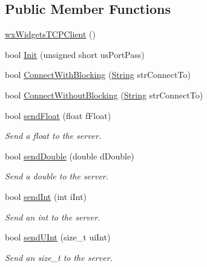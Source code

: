\subsection*{Public Member Functions}
\begin{DoxyCompactItemize}
\item 
\mbox{\hyperlink{class_rad_j_a_v_1_1_networking_1_1wx_widgets_t_c_p_client_af80442d38749a9cd12a45ef7d8f7928c}{wx\+Widgets\+T\+C\+P\+Client}} ()
\item 
bool \mbox{\hyperlink{class_rad_j_a_v_1_1_networking_1_1wx_widgets_t_c_p_client_aee6ffb935babab8f984e3edd6ab100cd}{Init}} (unsigned short us\+Port\+Pass)
\item 
bool \mbox{\hyperlink{class_rad_j_a_v_1_1_networking_1_1wx_widgets_t_c_p_client_a92d5158fc70110d7c152d32382418640}{Connect\+With\+Blocking}} (\mbox{\hyperlink{class_rad_j_a_v_1_1_string}{String}} str\+Connect\+To)
\item 
bool \mbox{\hyperlink{class_rad_j_a_v_1_1_networking_1_1wx_widgets_t_c_p_client_a2aebbf48ef53705babf0f4914cc8e23e}{Connect\+Without\+Blocking}} (\mbox{\hyperlink{class_rad_j_a_v_1_1_string}{String}} str\+Connect\+To)
\item 
bool \mbox{\hyperlink{class_rad_j_a_v_1_1_networking_1_1wx_widgets_t_c_p_client_ad683dafeb275ab9b1dd60bcd1f177107}{send\+Float}} (float f\+Float)
\begin{DoxyCompactList}\small\item\em Send a float to the server. \end{DoxyCompactList}\item 
bool \mbox{\hyperlink{class_rad_j_a_v_1_1_networking_1_1wx_widgets_t_c_p_client_afb57ef92f150833532015d14475a5ae1}{send\+Double}} (double d\+Double)
\begin{DoxyCompactList}\small\item\em Send a double to the server. \end{DoxyCompactList}\item 
bool \mbox{\hyperlink{class_rad_j_a_v_1_1_networking_1_1wx_widgets_t_c_p_client_a8463c6778160ef13bfd87dac47676614}{send\+Int}} (int i\+Int)
\begin{DoxyCompactList}\small\item\em Send an int to the server. \end{DoxyCompactList}\item 
bool \mbox{\hyperlink{class_rad_j_a_v_1_1_networking_1_1wx_widgets_t_c_p_client_a548db141df3e65127f8a96dbfe63cea1}{send\+U\+Int}} (size\+\_\+t ui\+Int)
\begin{DoxyCompactList}\small\item\em Send an size\+\_\+t to the server. \end{DoxyCompactList}\item 

\end{DoxyCompactItemize}
